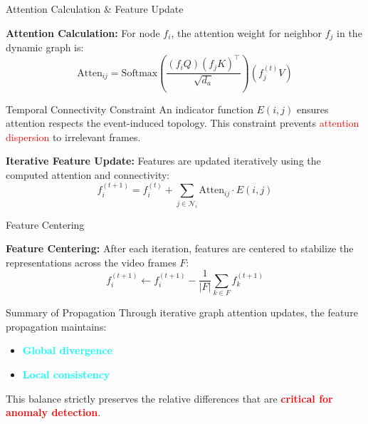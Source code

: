 \documentclass[aspectratio=169,xcolor=dvipsnames]{beamer}
\begin{document}
	
	
	\begin{frame}{Attention Calculation \& Feature Update}
		\small
		
		\textbf{Attention Calculation:}
		For node $f_i$, the attention weight for neighbor $f_j$ in the dynamic graph is:
		\[
		\text{Atten}_{ij} = \mathrm{Softmax}\left( \frac{(f_i Q)(f_j K)^\top}{\sqrt{d_a}} \right) (f_j^{(t)} V)
		\]
		
		\begin{block}{Temporal Connectivity Constraint}
			An indicator function $E(i, j)$ ensures attention respects the event-induced topology. This constraint prevents \textcolor{red}{attention dispersion} to irrelevant frames.
		\end{block}
		
		\vspace{0.5em}
		\textbf{Iterative Feature Update:}
		Features are updated iteratively using the computed attention and connectivity:
		\[
		f_i^{(t+1)} = f_i^{(t)} + \sum_{j \in \mathcal{N}_i} \text{Atten}_{ij} \cdot E(i, j)
		\]
	\end{frame}
	
	
	
	\begin{frame}{Feature Centering}
		\small
		
		\textbf{Feature Centering:}
		After each iteration, features are centered to stabilize the representations across the video frames $F$:
		\[
		f_i^{(t+1)} \leftarrow f_i^{(t+1)} - \frac{1}{|F|} \sum_{k \in F} f_k^{(t+1)}
		\]
		
		\vspace{0.5em}
		\begin{alertblock}{Summary of Propagation}
			Through iterative graph attention updates, the feature propagation maintains:
			\begin{itemize}
				\item \textcolor{cyan}{\textbf{Global divergence}}
				\item \textcolor{cyan}{\textbf{Local consistency}}
			\end{itemize}
		\end{alertblock}
		
		\vspace{0.5em}
		This balance strictly preserves the relative differences that are \textbf{\textcolor{red}{critical for anomaly detection}}.
	\end{frame}
	
\end{document}
